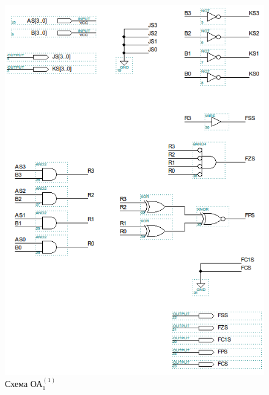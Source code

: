\begin{figure}[H]
	\includegraphics[scale=0.6]{images/altera/oa11_logic.png}
	\caption{Схема ОА$^{(1)}_{1}$}
	\label{figure:oa11log}
\end{figure}

